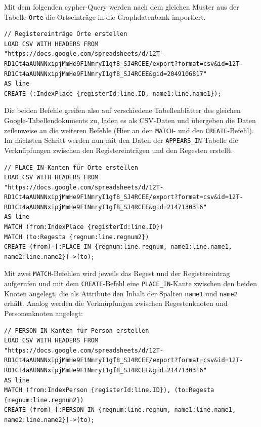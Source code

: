 \documentclass[ngerman,]{scrreprt}
\begin{document}
Mit dem folgenden cypher-Query werden nach dem gleichen Muster aus der Tabelle \texttt{Orte} die Ortseinträge in die Graphdatenbank importiert.

\begin{verbatim}
// Registereinträge Orte erstellen
LOAD CSV WITH HEADERS FROM "https://docs.google.com/spreadsheets/d/12T-RD1Ct4aAUNNNxipjMmHe9F1NmryI1gf8_SJ4RCEE/export?format=csv&id=12T-RD1Ct4aAUNNNxipjMmHe9F1NmryI1gf8_SJ4RCEE&gid=2049106817"
AS line
CREATE (:IndexPlace {registerId:line.ID, name1:line.name1});
\end{verbatim}

Die beiden Befehle greifen also auf verschiedene Tabellenblätter des gleichen Google-Tabellendokuments zu, laden es als CSV-Daten und übergeben die Daten zeilenweise an die weiteren Befehle (Hier an den \texttt{MATCH}- und den \texttt{CREATE}-Befehl). Im nächsten Schritt werden nun mit den Daten der \texttt{APPEARS\_IN}-Tabelle die Verknüpfungen zwischen den Registereinträgen und den Regesten erstellt.

\begin{verbatim}
// PLACE_IN-Kanten für Orte erstellen
LOAD CSV WITH HEADERS FROM "https://docs.google.com/spreadsheets/d/12T-RD1Ct4aAUNNNxipjMmHe9F1NmryI1gf8_SJ4RCEE/export?format=csv&id=12T-RD1Ct4aAUNNNxipjMmHe9F1NmryI1gf8_SJ4RCEE&gid=2147130316"
AS line
MATCH (from:IndexPlace {registerId:line.ID})
MATCH (to:Regesta {regnum:line.regnum2})
CREATE (from)-[:PLACE_IN {regnum:line.regnum, name1:line.name1, name2:line.name2}]->(to);
\end{verbatim}

Mit zwei \texttt{MATCH}-Befehlen wird jeweils das Regest und der Registereintrag aufgerufen und mit dem \texttt{CREATE}-Befehl eine \texttt{PLACE\_IN}-Kante zwischen den beiden Knoten angelegt, die als Attribute den Inhalt der Spalten \texttt{name1} und \texttt{name2} erhält. Analog werden die Verknüpfungen zwischen Regestenknoten und Personenknoten angelegt:

\begin{verbatim}
// PERSON_IN-Kanten für Person erstellen
LOAD CSV WITH HEADERS FROM "https://docs.google.com/spreadsheets/d/12T-RD1Ct4aAUNNNxipjMmHe9F1NmryI1gf8_SJ4RCEE/export?format=csv&id=12T-RD1Ct4aAUNNNxipjMmHe9F1NmryI1gf8_SJ4RCEE&gid=2147130316"
AS line
MATCH (from:IndexPerson {registerId:line.ID}), (to:Regesta {regnum:line.regnum2})
CREATE (from)-[:PERSON_IN {regnum:line.regnum, name1:line.name1, name2:line.name2}]->(to);
\end{verbatim}
\end{document}
